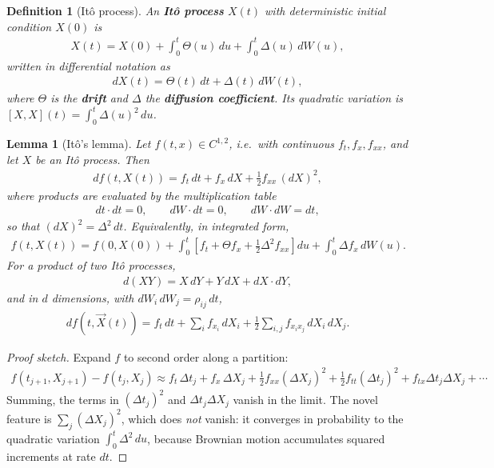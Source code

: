 \documentclass{report}
\theoremstyle{spacedplain}
\newtheorem{lemma}[theorem]{Lemma}
\theoremstyle{spaceddefinition}
\newtheorem{definition}[theorem]{Definition}
\theoremstyle{spacedremark}
\begin{document}
\begin{definition}[It\^o process]
An \textbf{It\^o process} $X(t)$ with deterministic initial condition $X(0)$ is
\begin{align}
    X(t) = X(0) + \int_0^t \Theta(u)\, du + \int_0^t \Delta(u)\, dW(u),
\end{align}
written in differential notation as
\begin{align}
    dX(t) = \Theta(t)\, dt + \Delta(t)\, dW(t),
\end{align}
where $\Theta$ is the \textbf{drift} and $\Delta$ the \textbf{diffusion coefficient}. Its quadratic variation is $[X,X](t) = \int_0^t\Delta(u)^2\,du$.
\end{definition}

\begin{lemma}[It\^o's lemma]
Let $f(t,x)\in C^{1,2}$, i.e.\ with continuous $f_t, f_x, f_{xx}$, and let $X$ be an It\^o process. Then
\begin{align}
    df(t, X(t)) = f_t\, dt + f_x\, dX + \tfrac{1}{2}f_{xx}\, (dX)^2,
\end{align}
where products are evaluated by the multiplication table
\begin{align}
    dt\cdot dt = 0, \qquad dW\cdot dt = 0, \qquad dW\cdot dW = dt,
\end{align}
so that $(dX)^2 = \Delta^2\,dt$. Equivalently, in integrated form,
\begin{align}
    f(t,X(t)) = f(0,X(0)) + \int_0^t\!\left[f_t + \Theta f_x + \tfrac12\Delta^2 f_{xx}\right] du + \int_0^t \Delta f_x\, dW(u).
\end{align}
For a product of two It\^o processes,
\begin{align}
    d(XY) = X\, dY + Y\, dX + dX\cdot dY,
\end{align}
and in $d$ dimensions, with $dW_i\,dW_j = \rho_{ij}\,dt$,
\begin{align}
    df(t,\vec{X}(t)) = f_t\,dt + \sum_i f_{x_i}\,dX_i + \tfrac12\sum_{i,j} f_{x_ix_j}\,dX_i\,dX_j.
\end{align}
\end{lemma}
\begin{proof}[Proof sketch]
Expand $f$ to second order along a partition:
\begin{align}
    f(t_{j+1},X_{j+1}) - f(t_j,X_j) \approx f_t\,\Delta t_j + f_x\,\Delta X_j + \tfrac12 f_{xx}(\Delta X_j)^2 + \tfrac12 f_{tt}(\Delta t_j)^2 + f_{tx}\Delta t_j\Delta X_j + \cdots
\end{align}
Summing, the terms in $(\Delta t_j)^2$ and $\Delta t_j \Delta X_j$ vanish in the limit. The novel feature is $\sum_j (\Delta X_j)^2$, which does \emph{not} vanish: it converges in probability to the quadratic variation $\int_0^t \Delta^2\,du$, because Brownian motion accumulates squared increments at rate $dt$.
\end{proof}
\end{document}
